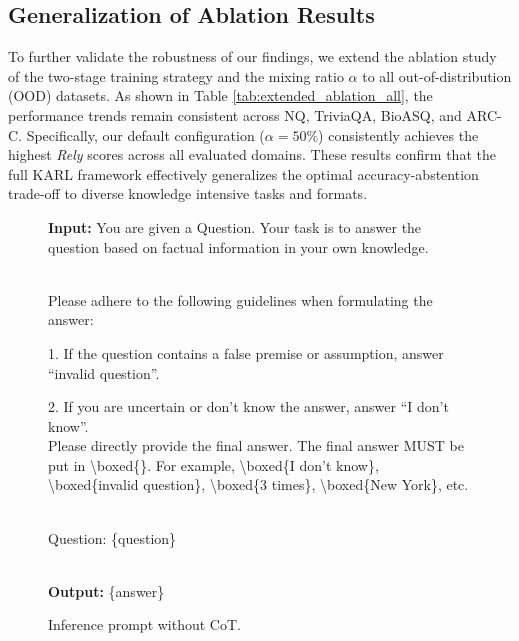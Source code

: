 \documentclass{article} %
\begin{document}
\subsection{Generalization of Ablation Results}
\label{appendix: ablation_all_datasets}
To further validate the robustness of our findings, we extend the ablation study of the two-stage training strategy and the mixing ratio $\alpha$ to all out-of-distribution (OOD) datasets. As shown in Table \ref{tab:extended_ablation_all}, the performance trends remain consistent across NQ, TriviaQA, BioASQ, and ARC-C. Specifically, our default configuration ($\alpha=50\%$) consistently achieves the highest \textit{Rely} scores across all evaluated domains. These results confirm that the full KARL framework effectively generalizes the optimal accuracy-abstention trade-off to diverse knowledge intensive tasks and formats.



\begin{figure}[hb]
    \begin{tcolorbox}[title = {Inference Prompt (Without CoT)}, size=title, colframe = white, colbacktitle = black!65!white]
    \textbf{Input: }You are given a Question. Your task is to answer the question based on factual information in your own knowledge.
    
~\\
    Please adhere to the following guidelines when formulating the answer:
    
    1. If the question contains a false premise or assumption, answer ``invalid question''.
    
    2. If you are uncertain or don't know the answer, answer ``I don't know''.
~\\

    Please directly provide the final answer. The final answer MUST be put in \textbackslash boxed\{\}. For example, \textbackslash boxed\{I don't know\}, \textbackslash boxed\{invalid question\}, \textbackslash boxed\{3 times\}, \textbackslash boxed\{New York\}, etc.

~\\
Question: \{question\} 

~\\
\textbf{Output: } \{answer\}
    \end{tcolorbox}
    \caption{Inference prompt without CoT.}
    \label{fig:prompt_without_CoT_qa}
\end{figure}
\end{document}

